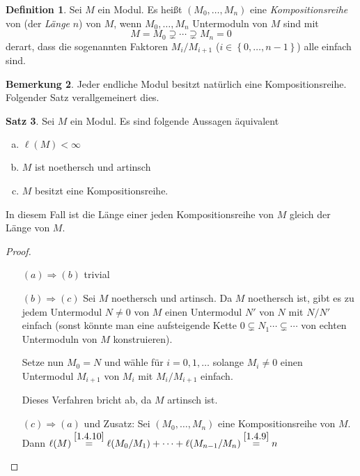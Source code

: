 \documentclass[
twoside=semi,
fontsize=12,
DIV=12, 
cleardoublepage=current,
leqno,
headings=optiontoheadandtoc, 
toc=idx
]{scrbook}
\newcommand{\set}[1]{\left\{ #1 \right\}}
\theoremstyle{definition}
\newtheorem{definition}{Definition}[section]
\newtheorem{bemerkung}[definition]{Bemerkung}
\newtheorem{satz}[definition]{Satz}
\begin{document}
	\begin{definition}\label{1.4.11}
		Sei $M$ ein Modul. Es heißt $(M_0, \dots, M_n)$ eine \emph{Kompositionsreihe} von (der \emph{L\"ange} $n$) von $M$, wenn $M_0, \dots, M_n$ Untermoduln von $M$ sind mit 
			\[M=M_0 \supsetneq \cdots \supsetneq M_n = 0\]
		derart, dass die sogenannten Faktoren $M_i/M_{i+1}$ ($i \in \set{0, \dots, n-1}$) alle einfach sind.
	\end{definition}

	\begin{bemerkung}\label{1.4.12}
		Jeder endliche Modul besitzt nat\"urlich eine Kompositionsreihe. Folgender Satz verallgemeinert dies.
	\end{bemerkung}

	\begin{satz}\label{1.4.13}
		Sei $M$ ein Modul. Es sind folgende Aussagen \"aquivalent
		
		\begin{enumerate}[(a)]
			\item $\ell(M) < \infty$
			\item $M$ ist noethersch und artinsch
			\item $M$ besitzt eine Kompositionsreihe.
		\end{enumerate}
		
		In diesem Fall ist die L\"ange einer jeden Kompositionsreihe von $M$ gleich der L\"ange von $M$.
		
		\begin{proof}\hfill
			\begin{enumerate}
				\item[$(a)\Rightarrow(b)$] trivial
				\item[$(b)\Rightarrow(c)$]
				Sei $M$ noethersch und artinsch. Da $M$ noethersch ist, gibt es zu jedem Untermodul $N \neq 0$ von $M$ einen Untermodul $N'$ von $N$ mit $N/N'$ einfach (sonst k\"onnte man eine aufsteigende Kette $0 \subsetneq N_1 \cdots \subsetneq  \cdots$ von echten Untermoduln von $M$ konstruieren).
				
				\noindent Setze nun $M_0 = N$ und w\"ahle f\"ur $i = 0, 1, \dots$ solange $M_i \neq 0$ einen Untermodul $M_{i+1}$ von $M_i$ mit $M_i/M_{i+1}$ einfach.
				
				\noindent Dieses Verfahren bricht ab, da $M$ artinsch ist.
				
				\item[$(c)\Rightarrow(a)$] und Zusatz: 
				Sei $(M_0, \dots, M_n)$ eine Kompositionsreihe von $M$. Dann $\ell(M) \overset{\ref{1.4.10}}{=} \ell(M_0/M_1) + \cdots + \ell(M_{n-1}/M_n) \overset{\ref{1.4.9}}{=} n$
			\end{enumerate}
		\end{proof}
	\end{satz}
\end{document}
